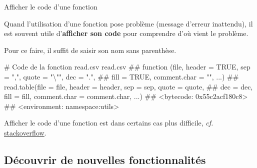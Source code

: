 \documentclass[12pt,ignorenonframetext,]{beamer}
\newenvironment{Shaded}{}{}
\newcommand{\CommentTok}[1]{\textcolor[rgb]{0.00,0.50,0.00}{#1}}
\newcommand{\NormalTok}[1]{#1}
\renewenvironment{Shaded}{\begin{snugshade}}{\end{snugshade}}
\begin{document}
\begin{frame}[fragile]{Afficher le code d'une fonction}

Quand l'utilisation d'une fonction pose problème (message d'erreur
inattendu), il est souvent utile d'\textbf{afficher son code} pour
comprendre d'où vient le problème.

\pause Pour ce faire, il suffit de saisir son nom sans parenthèse.

\footnotesize

\begin{Shaded}
\begin{Highlighting}[]
\CommentTok{# Code de la fonction read.csv}
\NormalTok{read.csv}
\NormalTok{  ## function (file, header = TRUE, sep = ",", quote = "\textbackslash{}"", dec = ".", }
\NormalTok{  ##     fill = TRUE, comment.char = "", ...) }
\NormalTok{  ## read.table(file = file, header = header, sep = sep, quote = quote, }
\NormalTok{  ##     dec = dec, fill = fill, comment.char = comment.char, ...)}
\NormalTok{  ## <bytecode: 0x55c2acf180c8>}
\NormalTok{  ## <environment: namespace:utils>}
\end{Highlighting}
\end{Shaded}

\pause \normalsize
Afficher le code d'une fonction est dans certains cas plus difficile,
\emph{cf.}
\href{http://stackoverflow.com/questions/19226816/how-can-i-view-the-source-code-for-a-function}{\underline{stackoverflow}}.

\end{frame}

\subsection{Découvrir de nouvelles
fonctionnalités}\label{decouvrir-de-nouvelles-fonctionnalites}
\end{document}
